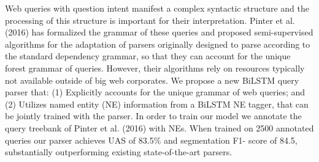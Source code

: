 Web queries with question intent manifest a complex syntactic structure and the processing of this structure is important for their interpretation. Pinter et al. (2016) has formalized the grammar of these queries and proposed semi-supervised algorithms for the adaptation of parsers originally designed to parse according to the standard dependency grammar, so that they can account for the unique forest grammar of queries. However, their algorithms rely on resources typically not available outside of big web corporates. We propose a new BiLSTM query parser that: (1) Explicitly accounts for the unique grammar of web queries; and (2) Utilizes named entity (NE) information from a BiLSTM NE tagger, that can be jointly trained with the parser. In order to train our model we annotate the query treebank of Pinter et al. (2016) with NEs. When trained on 2500 annotated queries our parser achieves UAS of 83.5\% and segmentation F1- score of 84.5, substantially outperforming existing state-of-the-art parsers.
